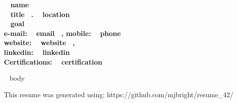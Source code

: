 \documentclass[11pt,english]{article}
\begin{document}

\begin{center}
\huge\bf\color{maincolor} ~{{ name }}~  \\
\small\color{black} ~{{ title }}~.  \small\color{black} ~{{ location }}~ \\
\small\color{black} ~{{ goal }}~ \\
\vspace{1.4mm}
\small\color{black} e-mail: ~{{ email }}~, \small\color{black} mobile: ~{{ phone }}~ \\
\small\color{black} website: ~{{ website }}~, \\
\small\color{black} linkedin: ~{{ linkedin }}~ \\
\vspace{1.4mm}
\small\color{black} Certifications: ~{{ certification }}~
\end{center}
\vspace{0.1mm}
~{{ body }}~
\begin{flushright}
\vspace{0.1mm}
\small This resume was generated using: https://github.com/mjbright/resume\_42/
\end{flushright}
\end{document}
